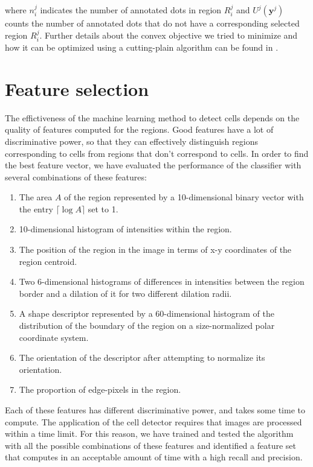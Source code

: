 	\noindent where $n_i^j$ indicates the number of annotated dots in region $R_i^j$ and $U^j(\textbf{y}^j)$ counts the number of annotated dots that do not have a corresponding selected region $R_i^j$. Further details about the convex objective we tried to minimize and how it can be optimized using a cutting-plain algorithm can be found in \cite{arteta12}.
		
	\section{Feature selection \statusfirstdraft}
	\label{sec:detector_feature}
	
	The effictiveness of the machine learning method to detect cells depends on the quality of features computed for the regions. Good features have a lot of discriminative power, so that they can effectively distinguish regions corresponding to cells from regions that don't correspond to cells. In order to find the best feature vector, we have evaluated the performance of the classifier with several combinations of these features:
	
	\begin{enumerate}
	    \item The area $A$ of the region represented by a 10-dimensional binary vector with the entry $\lceil \log A \rceil $ set to 1.
		\item 10-dimensional histogram of intensities within the region.
	    \item The position of the region in the image in terms of x-y coordinates of the region centroid.
	    \item Two 6-dimensional histograms of differences in intensities between the region border and a dilation of it for two different dilation radii.
	    \item A shape descriptor represented by a 60-dimensional histogram of the distribution of the boundary of the region on a size-normalized polar coordinate system.
	    \item The orientation of the descriptor after attempting to normalize its orientation.
	    \item The proportion of edge-pixels in the region.
	\end{enumerate}
	
	Each of these features has different discriminative power, and takes some time to compute. The application of the cell detector requires that images are processed within a time limit. For this reason, we have trained and tested the algorithm with all the possible combinations of these features and identified a feature set that computes in an acceptable amount of time with a high recall and precision.
	
